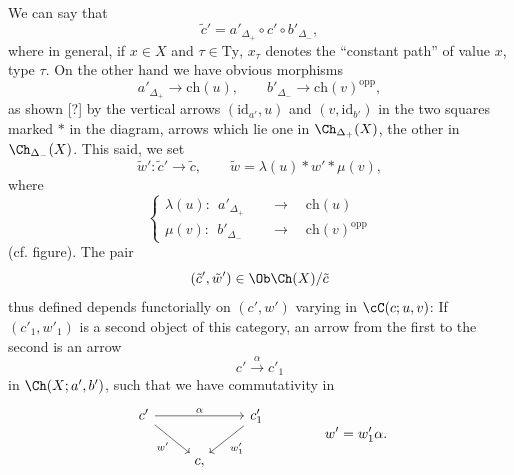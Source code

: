 We can say that
\[
\tilde{c}' = a'_{\Delta_{+}} \circ c' \circ b'_{\Delta_{-}},
\]
where in general, if $x \in X$ and $\tau \in \mathrm{Ty}$, $x_{\tau}$ denotes the ``constant path'' of value $x$, type $\tau$. On the other hand we have obvious morphisms
\[
a'_{\Delta_{+}} \longrightarrow \mathrm{ch}(u), \qquad b'_{\Delta_{-}} \longrightarrow \mathrm{ch}(v)^{\mathrm{opp}},
\]
as shown [?] by the vertical arrows $(\mathrm{id}_{a'},u)$ and $(v,\mathrm{id}_{b'})$ in the two squares marked $\ast$ in the diagram, arrows which lie one in $\Ch_{\Delta_{+}}(X)$, the other in $\Ch_{\Delta_{-}}(X)$. This said, we set
\[
\tilde{w}' : \tilde{c}' \longrightarrow \tilde{c}, \qquad \tilde{w} = \lambda(u) \ast w' \ast \mu(v), %
\]
where
\[
\left\{
\begin{aligned}
\lambda(u) :\ \ a'_{\Delta_{+}} &\quad\longrightarrow\quad \mathrm{ch}(u) \\
\mu(v) :\ \ b'_{\Delta_{-}} &\quad\longrightarrow\quad \mathrm{ch}(v)^{\mathrm{opp}}
\end{aligned}
\right.
\]
(cf. figure). The pair
\[
(\tilde{c}',\tilde{w}') \in \Ob \Ch(X)/\tilde{c}
\]
thus defined depends functorially on $(c',w')$ varying in $\cC(c;u,v)$: If $(c'_1,w'_1)$ is a second object of this category, an arrow from the first to the second is an arrow
\[
c' \xrightarrow{\alpha} c'_1
\]
in $\Ch(X;a',b')$, such that we have commutativity in
\[
\begin{tikzcd}
c' \ar[rr,"\alpha"] \ar[dr,"w'"'] & & c'_1 \ar[dl,"w'_1"] \\
& c, &
\end{tikzcd}
\qquad\qquad w' = w'_1\alpha.
\]

